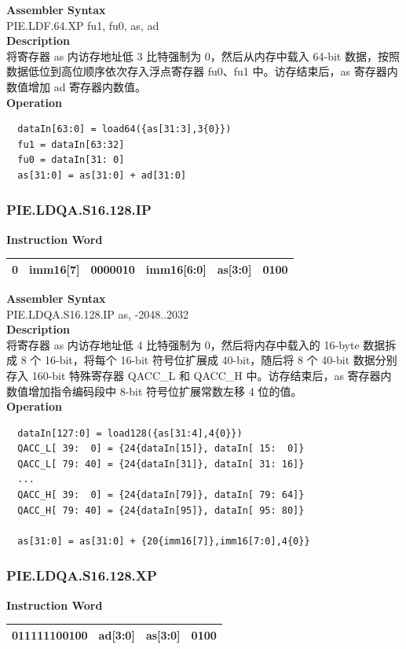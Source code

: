 \textbf{Assembler Syntax} \\
PIE.LDF.64.XP fu1, fu0, as, ad \\
\textbf{Description} \\
将寄存器 as 内访存地址低 3 比特强制为 0，然后从内存中载入 64-bit 数据，按照数据低位到高位顺序依次存入浮点寄存器 fu0、fu1 中。访存结束后，as 寄存器内数值增加 ad 寄存器内数值。\\
\textbf{Operation}
\begin{lstlisting}
  dataIn[63:0] = load64({as[31:3],3{0}})
  fu1 = dataIn[63:32]
  fu0 = dataIn[31: 0]
  as[31:0] = as[31:0] + ad[31:0]
\end{lstlisting}

\newpage
\subsubsection{PIE.LDQA.S16.128.IP}\label{instruction:PIELDQAS16128IP}
\setlength\tabcolsep{6pt}
\textbf{Instruction Word} \\
\begin{tabular}{|c|c|c|c|c|c|}
	\hline
	0 & imm16[7] & 0000010 & imm16[6:0] & as[3:0] & 0100 \\
	\hline
\end{tabular}

\textbf{Assembler Syntax} \\
PIE.LDQA.S16.128.IP as, -2048..2032 \\
\textbf{Description} \\
将寄存器 as 内访存地址低 4 比特强制为 0，然后将内存中载入的 16-byte 数据拆成 8 个 16-bit，将每个 16-bit 符号位扩展成 40-bit，随后将 8 个 40-bit 数据分别存入 160-bit 特殊寄存器 QACC\_L 和 QACC\_H 中。访存结束后，as 寄存器内数值增加指令编码段中 8-bit 符号位扩展常数左移 4 位的值。\\
\textbf{Operation}
\begin{lstlisting}
  dataIn[127:0] = load128({as[31:4],4{0}})
  QACC_L[ 39:  0] = {24{dataIn[15]}, dataIn[ 15:  0]}
  QACC_L[ 79: 40] = {24{dataIn[31]}, dataIn[ 31: 16]}
  ...
  QACC_H[ 39:  0] = {24{dataIn[79]}, dataIn[ 79: 64]}
  QACC_H[ 79: 40] = {24{dataIn[95]}, dataIn[ 95: 80]}

  as[31:0] = as[31:0] + {20{imm16[7]},imm16[7:0],4{0}}
\end{lstlisting}

\newpage
\subsubsection{PIE.LDQA.S16.128.XP}\label{instruction:PIELDQAS16128XP}
\setlength\tabcolsep{6pt}
\textbf{Instruction Word} \\
\begin{tabular}{|c|c|c|c|}
	\hline
	011111100100 & ad[3:0] & as[3:0] & 0100 \\
	\hline
\end{tabular}

